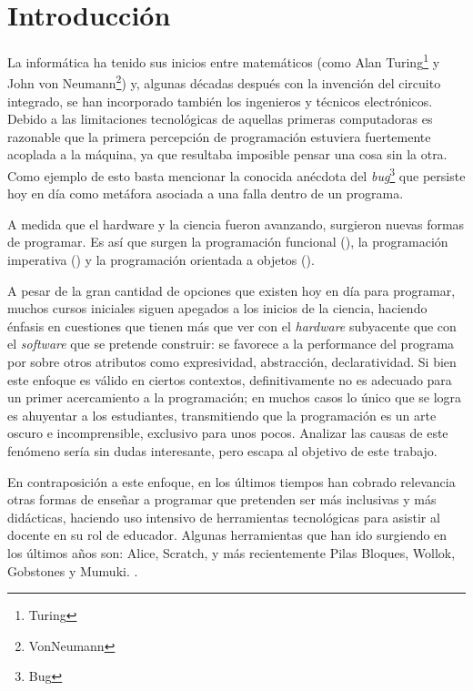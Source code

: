
\newcommand{\caracteristica}[1]{\item \textbf{#1:}}

\section{Introducción}
La informática ha tenido sus inicios entre matemáticos (como Alan Turing\footnote{Turing} y John von Neumann\footnote{VonNeumann}) y, algunas décadas después con la invención del circuito integrado, se han incorporado también los ingenieros y técnicos electrónicos. Debido a las limitaciones tecnológicas de aquellas primeras computadoras es razonable que la primera percepción de programación estuviera fuertemente acoplada a la máquina, ya que resultaba imposible pensar una cosa sin la otra. Como ejemplo de esto basta mencionar la conocida anécdota del \textit{bug}\footnote{Bug} que persiste hoy en día como metáfora asociada a una falla dentro de un programa.

A medida que el hardware y la ciencia fueron avanzando, surgieron nuevas formas de programar. Es así que surgen la programación funcional (), la programación imperativa () y la programación orientada a objetos ().

A pesar de la gran cantidad de opciones que existen hoy en día para programar, muchos cursos iniciales siguen apegados a los inicios de la ciencia, haciendo énfasis en cuestiones que tienen más que ver con el \textit{hardware} subyacente que con el \textit{software} que se pretende construir: se favorece a la performance del programa por sobre otros atributos como expresividad, abstracción, declaratividad. Si bien este enfoque es válido en ciertos contextos, definitivamente no es adecuado para un primer acercamiento a la programación; en muchos casos lo único que se logra es ahuyentar a los estudiantes, transmitiendo que la programación es un arte oscuro e incomprensible, exclusivo para unos pocos. Analizar las causas de este fenómeno sería sin dudas interesante, pero escapa al objetivo de este trabajo. 

En contraposición a este enfoque, en los últimos tiempos han cobrado relevancia otras formas de enseñar a programar que pretenden ser más inclusivas y más didácticas, haciendo uso intensivo de herramientas tecnológicas para asistir al docente en su rol de educador. Algunas herramientas que han ido surgiendo en los últimos años son: Alice, Scratch, y más recientemente Pilas Bloques, Wollok, Gobstones y Mumuki. .

